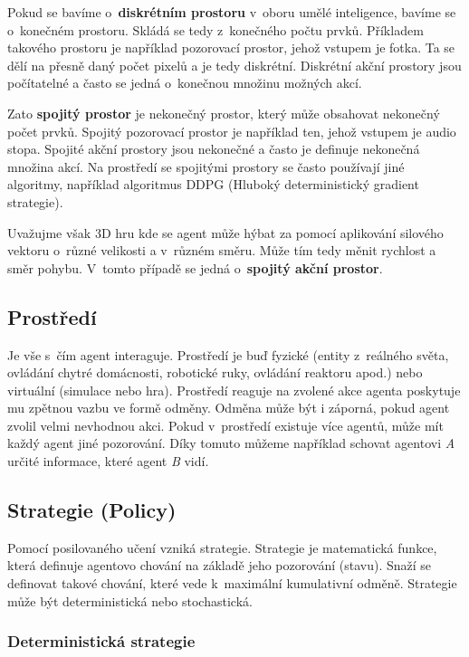 Pokud se bavíme o~\textbf{diskrétním prostoru} v~oboru umělé inteligence, bavíme se o~konečném prostoru. 
Skládá se tedy z~konečného počtu prvků.
Příkladem takového prostoru je například pozorovací prostor, jehož vstupem je fotka.
Ta se dělí na přesně daný počet pixelů a je tedy diskrétní.
Diskrétní akční prostory jsou počítatelné a často se jedná o~konečnou množinu možných akcí.

Zato \textbf{spojitý prostor} je nekonečný prostor, který může obsahovat nekonečný počet prvků. 
Spojitý pozorovací prostor je například ten, jehož vstupem je audio stopa.
Spojité akční prostory jsou nekonečné a často je definuje nekonečná množina akcí.
Na prostředí se spojitými prostory se často používají jiné algoritmy, například algoritmus DDPG (Hluboký deterministický gradient strategie).

\bigskip

Uvažujme však 3D hru kde se agent může hýbat za pomocí aplikování silového vektoru o~různé velikosti a v~různém směru.
Může tím tedy měnit rychlost a směr pohybu.
V~tomto případě se jedná o~\textbf{spojitý akční prostor}.

\subsection{Prostředí}\label{subsec:prostredi2}

Je vše s~čím agent interaguje.
Prostředí je buď fyzické (entity z~reálného světa, ovládání chytré domácnosti, robotické ruky, ovládání reaktoru apod.) nebo virtuální (simulace nebo hra).
Prostředí reaguje na zvolené akce agenta poskytuje mu zpětnou vazbu ve formě odměny.
Odměna může být i záporná, pokud agent zvolil velmi nevhodnou akci.
Pokud v~prostředí existuje více agentů, může mít každý agent jiné pozorování.
Díky tomuto můžeme například schovat agentovi \textit{A} určité informace, které agent \textit{B} vidí.

\subsection{Strategie (Policy)}\label{subsec:strategie}

Pomocí posilovaného učení vzniká strategie.
Strategie je matematická funkce, která definuje agentovo chování na základě jeho pozorování (stavu).
Snaží se definovat takové chování, které vede k~maximální kumulativní odměně.
Strategie může být deterministická nebo stochastická.

  \subsubsection*{Deterministická strategie}
  
